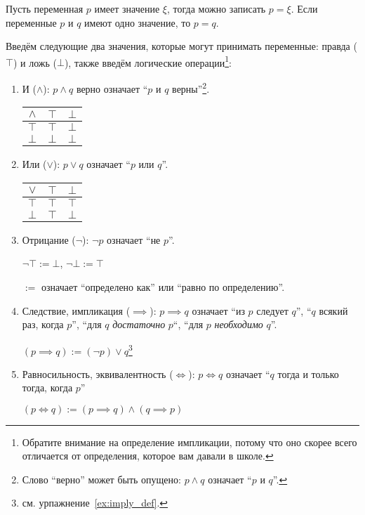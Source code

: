 Пусть переменная $p$ имеет значение $\xi$, тогда можно записать $p=\xi$. Если переменные
$p$ и $q$ имеют одно значение, то $p=q$.

Введём следующие два значения, которые могут принимать
переменные: правда ($\top$) и ложь ($\bot$), также введём логические
операции\footnote{Обратите внимание на определение импликации, потому что оно
	скорее всего отличается от определения, которое вам давали в школе.}:
\begin{enumerate}
	\item{}И ($\land$): $p\land q$ верно означает ``$p$ и $q$
	верны''\footnote{Слово ``верно'' может быть опущено: $p\land q$
		означает ``$p$ и $q$''.}.

	\begin{tabular}{c|cc}
		$\land$ & $\top$ & $\bot$ \\\hline
		$\top$  & $\top$ & $\bot$ \\
		$\bot$  & $\bot$ & $\bot$
	\end{tabular}

	\pagebreak

	\item{}Или ($\lor$): $p\lor q$ означает ``$p$ или $q$''.

	\begin{tabular}{c|cc}
		$\lor$ & $\top$ & $\bot$ \\\hline
		$\top$ & $\top$ & $\top$ \\
		$\bot$ & $\top$ & $\bot$
	\end{tabular}

	\item{}Отрицание ($\lnot$): $\lnot p$ означает ``не $p$''.

	$\lnot\top:=\bot$, $\lnot\bot:=\top$

	$:=$ означает ``определено как'' или ``равно по определению''.

	\item{}Следствие, импликация (${\implies}$): ${p\implies q}$ означает
	``из $p$ следует $q$'', ``$q$ всякий раз, когда $p$'', ``для $q$ {\it достаточно} $p$``,
	``для $p$ {\it необходимо} $q$''.

	$(p\implies q):=(\lnot p)\lor q$\footnote{см. урпажнение~\ref{ex:imply_def}.}

	\item{}Равносильность, эквивалентность (${\iff}$):
	${p\iff q}$ означает ``$q$ тогда и только
	тогда, когда $p$''

	$(p\iff q):=(p\implies q)\land (q\implies p)$
\end{enumerate}

